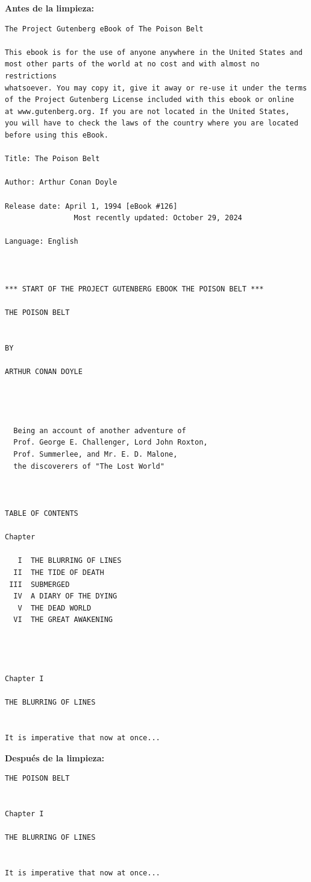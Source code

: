 \documentclass[IB]{TFUOC}%
\begin{document}
\textbf{Antes de la limpieza:}

\begin{verbatim}
The Project Gutenberg eBook of The Poison Belt

This ebook is for the use of anyone anywhere in the United States and
most other parts of the world at no cost and with almost no restrictions
whatsoever. You may copy it, give it away or re-use it under the terms
of the Project Gutenberg License included with this ebook or online
at www.gutenberg.org. If you are not located in the United States,
you will have to check the laws of the country where you are located
before using this eBook.

Title: The Poison Belt

Author: Arthur Conan Doyle

Release date: April 1, 1994 [eBook #126]
                Most recently updated: October 29, 2024

Language: English



*** START OF THE PROJECT GUTENBERG EBOOK THE POISON BELT ***

THE POISON BELT


BY

ARTHUR CONAN DOYLE




  Being an account of another adventure of
  Prof. George E. Challenger, Lord John Roxton,
  Prof. Summerlee, and Mr. E. D. Malone,
  the discoverers of "The Lost World"



TABLE OF CONTENTS

Chapter

   I  THE BLURRING OF LINES
  II  THE TIDE OF DEATH
 III  SUBMERGED
  IV  A DIARY OF THE DYING
   V  THE DEAD WORLD
  VI  THE GREAT AWAKENING




Chapter I

THE BLURRING OF LINES


It is imperative that now at once...
\end{verbatim}

\textbf{Después de la limpieza:}

\begin{verbatim}
THE POISON BELT


Chapter I

THE BLURRING OF LINES


It is imperative that now at once...
\end{verbatim}
\end{document}

